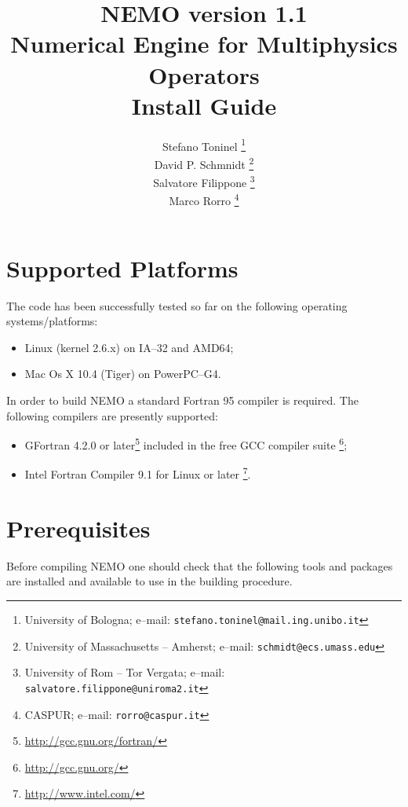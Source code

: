 \documentclass[a4paper,12pt]{article}%
\author{Stefano
  Toninel \thanks{University of Bologna; e--mail:
    \texttt{stefano.toninel@mail.ing.unibo.it}}\\
  David P. Schmnidt \thanks{University of Massachusetts -- Amherst;
    e--mail: \texttt{schmidt@ecs.umass.edu}}\\
  Salvatore Filippone \thanks{ University of Rom -- Tor Vergata;
    e--mail: \texttt{salvatore.filippone@uniroma2.it}} \\
  Marco Rorro \thanks{ CASPUR; e--mail: \texttt{rorro@caspur.it}}
}
\title{
  NEMO version 1.1\\
  Numerical Engine for Multiphysics Operators\\
  \bigskip
  Install Guide
}
\begin{document}
\maketitle
\newpage
\tableofcontents
\newpage

\section{Supported Platforms}
The code has been successfully tested so far on the following
operating systems/platforms:
\begin{itemize}
\item Linux (kernel 2.6.x) on IA--32 and AMD64;
\item Mac Os X 10.4 (Tiger) on PowerPC--G4.
\end{itemize}

In order to build NEMO a standard Fortran 95 compiler is required. The
following compilers are presently supported:
\begin{itemize}
\item GFortran 4.2.0 or later\footnote{\url{http://gcc.gnu.org/fortran/}}
  included in the free GCC compiler suite
  \footnote{\url{http://gcc.gnu.org/}};
\item Intel Fortran Compiler 9.1 for Linux or later
  \footnote{\url{http://www.intel.com/}}.
\end{itemize}


\section{Prerequisites}

Before compiling NEMO one should check that the following tools and
packages are installed and available to use in the building procedure.
\end{document}
